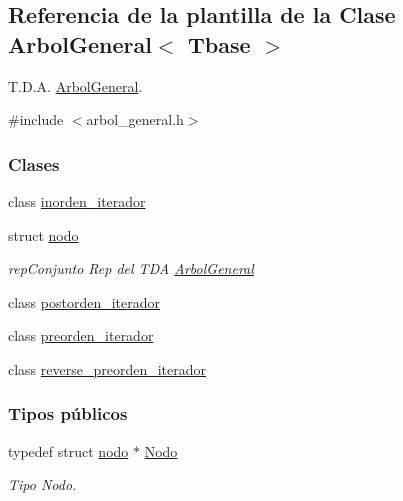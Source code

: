 \hypertarget{classArbolGeneral}{}\subsection{Referencia de la plantilla de la Clase Arbol\+General$<$ Tbase $>$}
\label{classArbolGeneral}


T.\+D.\+A. \hyperlink{classArbolGeneral}{Arbol\+General}.  




{\ttfamily \#include $<$arbol\+\_\+general.\+h$>$}

\subsubsection*{Clases}
\begin{DoxyCompactItemize}
\item 
class \hyperlink{classArbolGeneral_1_1inorden__iterador}{inorden\+\_\+iterador}
\item 
struct \hyperlink{structArbolGeneral_1_1nodo}{nodo}
\begin{DoxyCompactList}\small\item\em rep\+Conjunto Rep del T\+DA \hyperlink{classArbolGeneral}{Arbol\+General} \end{DoxyCompactList}\item 
class \hyperlink{classArbolGeneral_1_1postorden__iterador}{postorden\+\_\+iterador}
\item 
class \hyperlink{classArbolGeneral_1_1preorden__iterador}{preorden\+\_\+iterador}
\item 
class \hyperlink{classArbolGeneral_1_1reverse__preorden__iterador}{reverse\+\_\+preorden\+\_\+iterador}
\end{DoxyCompactItemize}
\subsubsection*{Tipos públicos}
\begin{DoxyCompactItemize}
\item 
typedef struct \hyperlink{structArbolGeneral_1_1nodo}{nodo} $\ast$ \hyperlink{classArbolGeneral_a12cc1b74a9095d89bc7334290d332f7a}{Nodo}
\begin{DoxyCompactList}\small\item\em Tipo Nodo. \end{DoxyCompactList}\end{DoxyCompactItemize}
